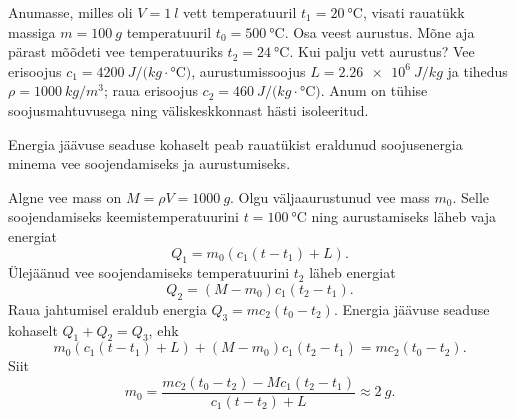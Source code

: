 
Anumasse, milles oli $V=\SI{1}{l}$ vett temperatuuril $t_1=\SI{20}{\degreeCelsius}$,
visati rauatükk massiga $m=\SI{100}{g}$ temperatuuril $t_0=\SI{500}{\degreeCelsius}$. Osa
veest aurustus. Mõne aja pärast mõõdeti vee temperatuuriks
$t_2=\SI{24}{\degreeCelsius}$. Kui palju vett aurustus? Vee erisoojus
$c_1=\SI{4200}{J/(kg\cdot\degreeCelsius)}$, aurustumissoojus $L=\SI{2,26 e6}{J/kg}$ ja
tihedus $\rho=\SI{1000}{kg/m^3}$; raua
erisoojus $c_2=\SI{460}{J/(kg\cdot\degreeCelsius)}$. Anum on tühise soojusmahtuvusega ning väliskeskkonnast
hästi isoleeritud.

\hint
Energia jäävuse seaduse kohaselt peab rauatükist eraldunud soojusenergia minema vee soojendamiseks ja aurustumiseks.

\solu
Algne vee mass on $M=\rho V=\SI{1000}{g}$. Olgu väljaaurustunud vee mass $m_0$. Selle soojendamiseks keemistemperatuurini $t=\SI{100}{\degreeCelsius}$ ning aurustamiseks läheb vaja energiat
\[
Q_1=m_0(c_1(t-t_1)+L).
\]
Ülejäänud vee soojendamiseks temperatuurini $t_2$ läheb energiat
\[
Q_2=(M-m_0)c_1(t_2-t_1).
\]
Raua jahtumisel eraldub energia $Q_3=mc_2(t_0-t_2)$. Energia jäävuse seaduse kohaselt $Q_1+Q_2=Q_3$, ehk
\[
m_0(c_1(t-t_1)+L)+(M-m_0)c_1(t_2-t_1)=mc_2(t_0-t_2).
\]
Siit
\[
m_0=\frac{mc_2(t_0-t_2)-Mc_1(t_2-t_1)}{c_1(t-t_2)+L}\approx \SI{2}{g}.
\]
\probend